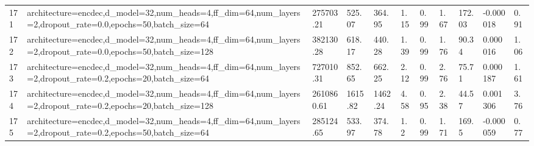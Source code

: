\begin{longtable}{C{0.8cm} L{2cm} C{1.15cm} C{1.15cm} C{1.15cm} C{1.15cm} C{0.85cm} C{1.25cm} C{1.2cm} C{1.5cm} C{1.0cm}}
171 & architecture=encdec,\newline d\_model=32,\newline num\_heads=4,\newline ff\_dim=64,\newline num\_layers=2,\newline dropout\_rate=0.0,\newline epochs=50,\newline batch\_size=64 & 275703.21 & 525.07 & 364.95 & 1.15 & 0.99 & 1.67 & 172.03 & -0.000018 & 0.91 \\
172 & architecture=encdec,\newline d\_model=32,\newline num\_heads=4,\newline ff\_dim=64,\newline num\_layers=2,\newline dropout\_rate=0.0,\newline epochs=50,\newline batch\_size=128 & 382130.28 & 618.17 & 440.28 & 1.39 & 0.99 & 1.76 & 90.34 & 0.000016 & 1.06 \\
173 & architecture=encdec,\newline d\_model=32,\newline num\_heads=4,\newline ff\_dim=64,\newline num\_layers=2,\newline dropout\_rate=0.2,\newline epochs=20,\newline batch\_size=64 & 727010.31 & 852.65 & 662.25 & 2.12 & 0.99 & 2.76 & 75.71 & 0.000187 & 1.61 \\
174 & architecture=encdec,\newline d\_model=32,\newline num\_heads=4,\newline ff\_dim=64,\newline num\_layers=2,\newline dropout\_rate=0.2,\newline epochs=20,\newline batch\_size=128 & 2610860.61 & 1615.82 & 1462.24 & 4.58 & 0.95 & 2.38 & 44.57 & 0.001306 & 3.76 \\
175 & architecture=encdec,\newline d\_model=32,\newline num\_heads=4,\newline ff\_dim=64,\newline num\_layers=2,\newline dropout\_rate=0.2,\newline epochs=50,\newline batch\_size=64 & 285124.65 & 533.97 & 374.78 & 1.2 & 0.99 & 1.71 & 169.5 & -0.000059 & 0.77 \\

\end{longtable}
